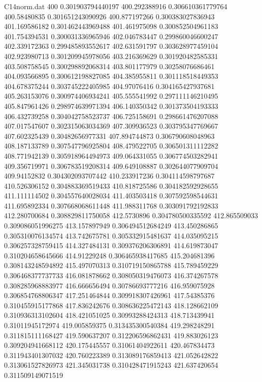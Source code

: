 \begin{filecontents}{C14norm.dat}
400			0.301903794440197
400.292388916			0.306610361779764
400.58480835			0.301651243090926
400.877197266			0.300383027836943
401.169586182			0.301462443969488
401.461975098			0.300852504961183
401.754394531			0.300031336965946
402.046783447			0.299860046600247
402.339172363			0.299485893552617
402.631591797			0.303628977459104
402.923980713			0.301209945978056
403.216369629			0.301920482585331
403.508758545			0.300298892068314
403.801177979			0.30258076686461
404.093566895			0.300612198827085
404.385955811			0.301118518449353
404.678375244			0.303745222405985
404.97076416			0.304165427937681
405.263153076			0.300974406934241
405.555541992			0.297111146210495
405.847961426			0.298974639971394
406.140350342			0.301373504193333
406.432739258			0.304042758523737
406.725158691			0.298661476207088
407.017547607			0.302315063034369
407.309936523			0.303795347769667
407.602325439			0.30482656977331
407.894744873			0.306790608048963
408.187133789			0.307547796925804
408.479522705			0.306501311112282
408.771942139			0.305918964494973
409.064331055			0.306774503282941
409.356719971			0.306783519208314
409.649108887			0.302644077909704
409.94152832			0.304302093707442
410.233917236			0.304114598797687
410.526306152			0.304883369519433
410.818725586			0.304182592928655
411.111114502			0.304557640028034
411.403503418			0.307592598544631
411.695892334			0.307668068611448
411.988311768			0.303091792192833
412.280700684			0.308829811750058
412.5730896			0.304780500335592
412.865509033			0.309086051996275
413.157897949			0.306494512684249
413.450286865			0.305310076134574
413.742675781			0.305332915481637
414.035095215			0.306257328759415
414.327484131			0.309376206306891
414.619873047			0.310204658645666
414.91229248			0.306465938417685
415.204681396			0.308143248594892
415.497070313			0.310719150865788
415.789459229			0.306468377737733
416.081878662			0.308050319476073
416.374267578			0.308285968883977
416.666656494			0.30786693777216
416.959075928			0.306854768806347
417.251464844			0.309918307426961
417.54385376			0.310455915177868
417.836242676			0.308636225472143
418.128662109			0.310936313102604
418.421051025			0.30993288424313
418.713439941			0.31011945172974
419.005859375			0.313435300540384
419.298248291			0.311815111168427
419.590637207			0.312206596862431
419.883026123			0.309204941668112
420.175445557			0.31061404922611
420.467834473			0.311943401307032
420.760223389			0.313089176859413
421.052642822			0.313061527826973
421.345031738			0.310428471915243
421.637420654			0.311509149071519

\end{filecontents}
